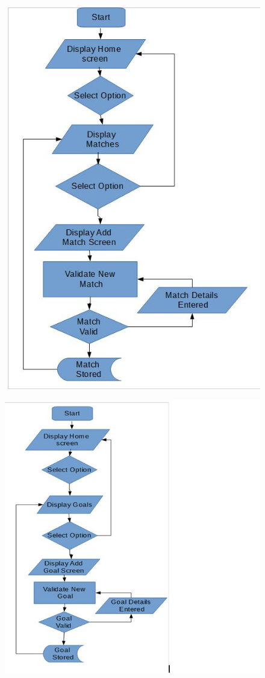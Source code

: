 \begin{figure}[H]
	\includegraphics[width=150mm]{MatchFc}
\end{figure}
\begin{figure}[H]
	\includegraphics[width=150mm]{goalsFc}
\end{figure}
